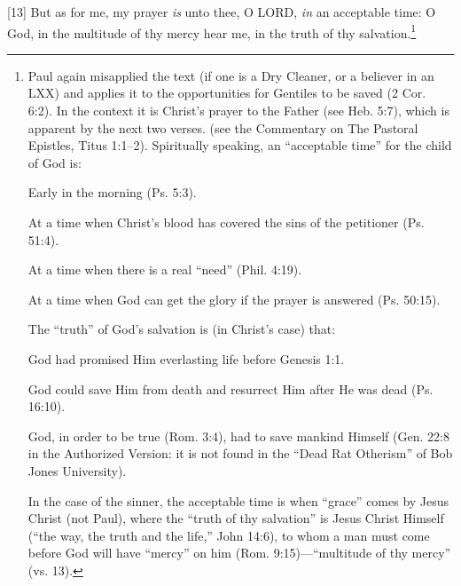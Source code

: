 [13] \textcolor[rgb]{0.00,0.00,1.00}{But as for me, my prayer \emph{is} unto thee, O LORD, \emph{in} an acceptable time: O God, in the multitude of thy mercy hear me, in the truth of thy salvation.}\footnote{Paul again misapplied the text (if one is a Dry Cleaner, or a believer in an LXX) and applies it to the opportunities for Gentiles to be saved (2 Cor. 6:2). In the context it is Christ’s prayer to the Father (see Heb. 5:7), which is apparent by the next two verses. (see the Commentary on The Pastoral Epistles, Titus 1:1--2). Spiritually speaking, an “acceptable time” for the child of God is: \cite{Ruckman1992Psalms} 
\begin{compactenum}
\item Early in the morning (Ps. 5:3).
\item At a time when Christ’s blood has covered the sins of the petitioner (Ps. 51:4).
\item At a time when there is a real “need” (Phil. 4:19).
\item At a time when God can get the glory if the prayer is answered (Ps. 50:15).
\end{compactenum}
The “truth” of God’s salvation is (in Christ’s case) that:
\begin{compactenum}
\item God had promised Him everlasting life before Genesis 1:1.
\item God could save Him from death and resurrect Him after He was dead (Ps. 16:10).
\item God, in order to be true (Rom. 3:4), had to save mankind Himself (Gen. 22:8 in the
Authorized Version: it is not found in the “Dead Rat Otherism” of Bob Jones University).
\end{compactenum}
In the case of the sinner, the acceptable time is when “grace” comes by Jesus Christ (not Paul), where the “truth of thy salvation” is Jesus Christ Himself (“the way, the truth and the life,” John 14:6), to whom a man must come before God will have “mercy” on him (Rom. 9:15)—“multitude of thy mercy” (vs. 13).}
